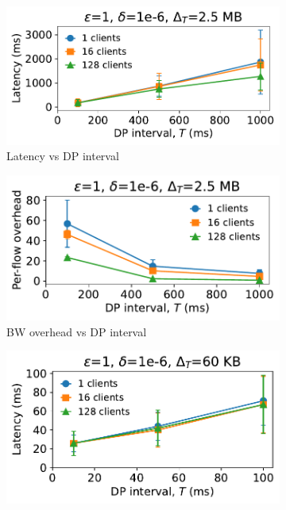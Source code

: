 \begin{figure}[t]
  \centering
  \begin{subfigure}{0.49\columnwidth}
      \centering
%
      \includegraphics[width=\textwidth]{latency_vs_dp_interval_video_updated.pdf}
      \caption{Latency vs DP interval}
      \label{fig:video-lat-vs-dpInt}
  \end{subfigure}
  \hfill
  \begin{subfigure}{0.49\columnwidth}
      \centering
      \includegraphics[width=\textwidth]{overhead_vs_dp_interval_video_updated.pdf}
      \caption{BW overhead vs DP interval}
      \label{fig:video-overhead-vs-dpInt}
  \end{subfigure}
  \begin{subfigure}{0.49\columnwidth}
      \centering
      \includegraphics[width=\textwidth]{latency_vs_dp_interval_web_updated.pdf}

\end{subfigure}
\end{figure}
